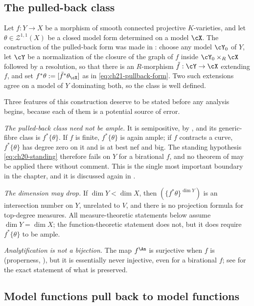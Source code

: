 \subsection{The pulled-back class}
\label{sec:ch30-pullback-class}

Let \(f:Y\to X\) be a morphism of smooth connected projective
\(K\)-varieties, and let \(\theta\in\mathcal Z^{1,1}(X)\) be a closed model
form determined on a model \(\cX\).  The construction of the pulled-back
form was made in : choose any model \(\cY_0\) of
\(Y\), let \(\cY\) be a normalization of the closure of the graph of \(f\)
inside \(\cY_0\times_R\cX\) followed by a resolution, so that there is an
\(R\)-morphism \(\tilde f:\cY\to\cX\) extending \(f\), and set
\(f^*\theta:=[\tilde f^*\theta_{\cX}]\) as in
\eqref{eq:ch21-pullback-form}.  Two such extensions agree on a model of
\(Y\) dominating both, so the class is well defined.

Three features of this construction deserve to be stated before any analysis
begins, because each of them is a potential source of error.

\emph{The pulled-back class need not be ample.}  It is semipositive, by
, and its generic-fibre class is \(f^*\{\theta\}\).
If \(f\) is finite, \(f^*\{\theta\}\) is again ample; if \(f\) contracts a
curve, \(f^*\{\theta\}\) has degree zero on it and is at best nef and big.
The standing hypothesis \eqref{eq:ch20-standing} therefore fails on \(Y\)
for a birational \(f\), and no theorem of
 may be applied there without
comment.  This is the single most important boundary in the chapter, and it
is discussed again in .

\emph{The dimension may drop.}  If \(\dim Y<\dim X\), then
\((\{f^*\theta\}^{\dim Y})\) is an intersection number on \(Y\), unrelated to
\(V\), and there is no projection formula for top-degree measures.  All
measure-theoretic statements below assume \(\dim Y=\dim X\); the
function-theoretic statement  does not, but it
does require \(f^*\{\theta\}\) to be ample.

\emph{Analytification is not a bijection.}  The map \(f^{\An}\) is
surjective when \(f\) is (properness, ), but
it is essentially never injective, even for a birational \(f\); see
 for the exact statement of what is
preserved.

\subsection{Model functions pull back to model functions}
\label{sec:ch30-pullback-model}

